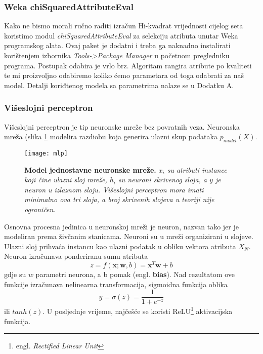 \subsubsection*{Weka chiSquaredAttributeEval}
Kako ne bismo morali ručno raditi izračun Hi-kvadrat vrijednosti cijelog seta koristimo modul \textit{chiSquaredAttributeEval} za selekciju atributa unutar Weka programskog alata. Ovaj paket je dodatni i treba ga naknadno instalirati korištenjem izbornika \textit{Tools->Package Manager} u početnom pregledniku programa. Postupak odabira je vrlo brz. Algoritam rangira atribute po kvaliteti te mi proizvoljno odabiremo koliko ćemo parametara od toga odabrati za naš model. Detalji koriđtenog modela sa parametrima nalaze se u Dodatku A.

\subsubsection{Višeslojni perceptron}
Višeslojni perceptron je tip neuronske mreže bez povratnih veza. Neuronska mreža (slika \ref{fig:mlp} modelira razdiobu koja generira ulazni skup podataka $p_{model}(X)$.
\begin{figure}[!ht]
    \centering
    \texttt{[image: mlp]}
    \caption[Model jednostavne neuronske mreže]{\textbf{Model jednostavne neuronske mreže.} \textit{$x_i$ su atributi instance koji čine ulazni sloj mreže, $h_i$ su neuroni skrivenog sloja, a $y$ je neuron u izlaznom sloju. Višeslojni perceptron mora imati minimalno ova tri sloja, a broj skrivenih slojeva u teoriji nije ograničen.}}
    \label{fig:mlp}
\end{figure}

Osnovna procesna jedinica u neuronskoj mreži je neuron, nazvan tako jer je modeliran prema živčanim stanicama. Neuroni su u mreži organizirani u slojeve. Ulazni sloj prihvaća instancu kao ulazni podatak u obliku vektora atributa $X_N$. Neuron izračunava ponderiranu sumu atributa
\begin{equation}
    z = f(\textbf{x};\textbf{w},b) = \textbf{x}^T\textbf{w} + b
\end{equation}
gdje su $w$ parametri neurona, a b pomak (engl. \textbf{bias}). 
Nad rezultatom ove funkcije izračunava nelinearna transformacija, sigmoidna funkcija oblika
\begin{equation}
    y = \sigma(z) = \frac{1}{1+e^{-z}}
\end{equation}
ili $tanh(z)$. U posljednje vrijeme, najčešće se koristi ReLU\footnote{engl. \textit{Rectified Linear Unit}} aktivacijska funkcija.

